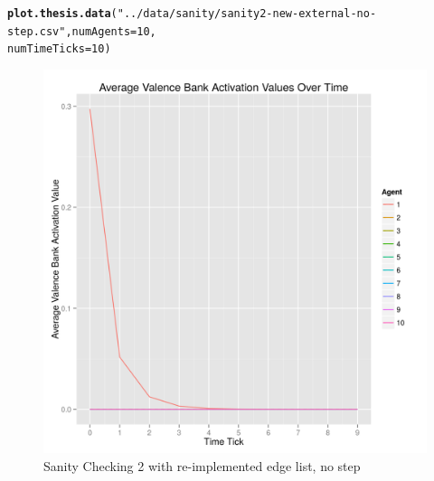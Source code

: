 \documentclass{article}\usepackage[]{graphicx}\usepackage[]{color}
\makeatletter
\def\maxwidth{ %
  \ifdim\Gin@nat@width>\linewidth
    \linewidth
  \else
    \Gin@nat@width
  \fi
}
\newcommand{\hlnum}[1]{\textcolor[rgb]{0.686,0.059,0.569}{#1}}%
\newcommand{\hlstr}[1]{\textcolor[rgb]{0.192,0.494,0.8}{#1}}%
\newcommand{\hlstd}[1]{\textcolor[rgb]{0.345,0.345,0.345}{#1}}%
\newcommand{\hlkwc}[1]{\textcolor[rgb]{0.333,0.667,0.333}{#1}}%
\newcommand{\hlkwd}[1]{\textcolor[rgb]{0.737,0.353,0.396}{\textbf{#1}}}%
\newenvironment{kframe}{%
 \def\at@end@of@kframe{}%
 \ifinner\ifhmode%
  \def\at@end@of@kframe{\end{minipage}}%
  \begin{minipage}{\columnwidth}%
 \fi\fi%
 \def\FrameCommand##1{\hskip\@totalleftmargin \hskip-\fboxsep
 \colorbox{shadecolor}{##1}\hskip-\fboxsep
     \hskip-\linewidth \hskip-\@totalleftmargin \hskip\columnwidth}%
 \MakeFramed {\advance\hsize-\width
   \@totalleftmargin\z@ \linewidth\hsize
   \@setminipage}}%
 {\par\unskip\endMakeFramed%
 \at@end@of@kframe}
\newenvironment{knitrout}{}{} %
\makeatother
\begin{document}
\newpage
\begin{knitrout}
\color{fgcolor}\begin{kframe}
\begin{alltt}
\hlkwd{plot.thesis.data}\hlstd{(}\hlstr{"../data/sanity/sanity2-new-external-no-step.csv"}\hlstd{,} \hlkwc{numAgents} \hlstd{=} \hlnum{10}\hlstd{,}
    \hlkwc{numTimeTicks} \hlstd{=} \hlnum{10}\hlstd{)}
\end{alltt}
\end{kframe}\begin{figure}[]

\includegraphics[width=\maxwidth]{figure/plot-sanity-2-v2-nostep} \caption[Sanity Checking 2 with re-implemented edge list, no step]{Sanity Checking 2 with re-implemented edge list, no step\label{fig:plot-sanity-2-v2-nostep}}
\end{figure}


\end{knitrout}


\newpage
\end{document}
